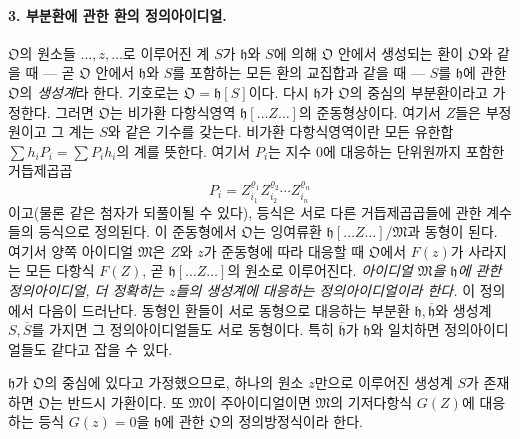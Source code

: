 \paragraph{3. 부분환에 관한 환의 정의아이디얼.}
\(\mathfrak O\)의 원소들 \(\ldots,z,\ldots\)로 이루어진 계 \(S\)가 \(\mathfrak h\)와 \(S\)에 의해 \(\mathfrak O\) 안에서 생성되는 환이 \(\mathfrak O\)와 같을 때 --- 곧 \(\mathfrak O\) 안에서 \(\mathfrak h\)와 \(S\)를 포함하는 모든 환의 교집합과 같을 때 --- \(S\)를 \(\mathfrak h\)에 관한 \(\mathfrak O\)의 \emph{생성계}라 한다. 기호로는 \(\mathfrak O=\mathfrak h[S]\)이다. 다시 \(\mathfrak h\)가 \(\mathfrak O\)의 중심의 부분환이라고 가정한다. 그러면 \(\mathfrak O\)는 비가환 다항식영역 \(\mathfrak h[\ldots Z\ldots]\)의 준동형상이다. 여기서 \(Z\)들은 부정원이고 그 계는 \(S\)와 같은 기수를 갖는다. 비가환 다항식영역이란 모든 유한합 \(\sum h_iP_i=\sum P_i h_i\)의 계를 뜻한다. 여기서 \(P_i\)는 지수 0에 대응하는 단위원까지 포함한 거듭제곱곱
\[
P_i=Z_{i_1}^{\varrho_1}Z_{i_2}^{\varrho_2}\cdots Z_{i_n}^{\varrho_n}
\]
이고(물론 같은 첨자가 되풀이될 수 있다), 등식은 서로 다른 거듭제곱곱들에 관한 계수들의 등식으로 정의된다. 이 준동형에서 \(\mathfrak O\)는 잉여류환 \(\mathfrak h[\ldots Z\ldots]/\mathfrak M\)과 동형이 된다. 여기서 양쪽 아이디얼 \(\mathfrak M\)은 \(Z\)와 \(z\)가 준동형에 따라 대응할 때 \(\mathfrak O\)에서 \(F(z)\)가 사라지는 모든 다항식 \(F(Z)\), 곧 \(\mathfrak h[\ldots Z\ldots]\)의 원소로 이루어진다. \emph{아이디얼 \(\mathfrak M\)을 \(\mathfrak h\)에 관한 정의아이디얼, 더 정확히는 \(z\)들의 생성계에 대응하는 정의아이디얼이라 한다.} 이 정의에서 다음이 드러난다. 동형인 환들이 서로 동형으로 대응하는 부분환 \(\mathfrak h,\overline{\mathfrak h}\)와 생성계 \(S,\overline S\)를 가지면 그 정의아이디얼들도 서로 동형이다. 특히 \(\overline{\mathfrak h}\)가 \(\mathfrak h\)와 일치하면 정의아이디얼들도 같다고 잡을 수 있다.

\(\mathfrak h\)가 \(\mathfrak O\)의 중심에 있다고 가정했으므로, 하나의 원소 \(z\)만으로 이루어진 생성계 \(S\)가 존재하면 \(\mathfrak O\)는 반드시 가환이다. 또 \(\mathfrak M\)이 주아이디얼이면 \(\mathfrak M\)의 기저다항식 \(G(Z)\)에 대응하는 등식 \(G(z)=0\)을 \(\mathfrak h\)에 관한 \(\mathfrak O\)의 정의방정식이라 한다.

